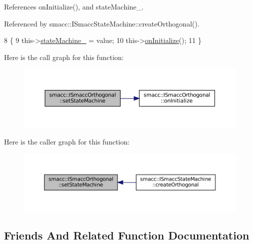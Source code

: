 References on\+Initialize(), and state\+Machine\+\_\+.



Referenced by smacc\+::\+I\+Smacc\+State\+Machine\+::create\+Orthogonal().


\begin{DoxyCode}
8   \{
9     this->\hyperlink{classsmacc_1_1ISmaccOrthogonal_a418b2e094a65013444ec1fca7e94f28d}{stateMachine\_} = value;
10     this->\hyperlink{classsmacc_1_1ISmaccOrthogonal_a6bb31c620cb64dd7b8417f8705c79c7a}{onInitialize}();
11   \}
\end{DoxyCode}
Here is the call graph for this function\+:
\nopagebreak
\begin{figure}[H]
\begin{center}
\leavevmode
\includegraphics[width=350pt]{classsmacc_1_1ISmaccOrthogonal_a0fa0901a322f62a604c279c06d34f2f0_cgraph}
\end{center}
\end{figure}
Here is the caller graph for this function\+:
\nopagebreak
\begin{figure}[H]
\begin{center}
\leavevmode
\includegraphics[width=350pt]{classsmacc_1_1ISmaccOrthogonal_a0fa0901a322f62a604c279c06d34f2f0_icgraph}
\end{center}
\end{figure}


\subsection{Friends And Related Function Documentation}
\mbox{\label{classsmacc_1_1ISmaccOrthogonal_a0e71d23a61c07d55f419d02237d03b6a}} 
